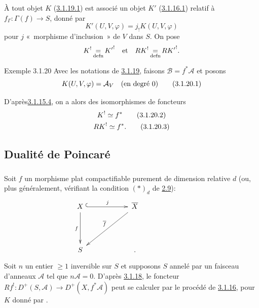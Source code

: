 \documentclass[10pt]{../fichiers-configuration-latex/smfart}
\begin{document}
À tout objet $K$ (\hyperref[XVIII.par3.1.19.1]{3.1.19.1}) est associé un objet $K'$
(\hyperref[XVIII.par3.1.16.1]{3.1.16.1}) 
relatif à $f_{\Gamma}:\Gamma(f)\rightarrow S$, donné par
\begin{equation*}
K'(U,V,\varphi)=j_{!}K(U,V,\varphi)\tag{3.1.19.2}
\end{equation*}%
pour $j$ « morphisme d'inclusion »  de $V$ dans $S$. On pose
$$
K^{!}\mathop{=}_{\operatorname{defn}} {K'}^{!}\quad \text{et}\quad RK^{!}\mathop{=}_{\operatorname{defn}}
R{K'}^{!}{}.
$$

\begin{enonce*}[remark]{Exemple 3.1.20}
Avec les notations de \hyperref[XVIII.exem3.1.19]{3.1.19}, faisons
$\mathcal{B}=f^{\ast}\mathcal{A}$ et posons
\begin{equation*}
K(U,V,\varphi)=\mathcal{A}_{V}\quad\text{\rm(en degré 0)}\tag{3.1.20.1}
\end{equation*}
\end{enonce*}

D'après\pageoriginale \hyperref[XVIII.par3.1.15.4]{3.1.15.4}, on a alors des
isomorphismes de foncteurs
\begin{gather*}
K^{!}\simeq f^{\ast}\tag{3.1.20.2}\\
RK^{!}\simeq f^{\ast}{}.\tag{3.1.20.3}
\end{gather*}

\subsection{Dualité de Poincaré}

\subsubsection{}
Soit $f$ un morphisme plat compactifiable purement de dimension
relative $d$ (ou, plus généralement, vérifiant la condition
$(\ast)_{d}$ de \hyperref[XVIII.thm2.9]{2.9}):
$$
\xymatrix@C=2cm@R=1.5cm@M=.2cm{
X \ar@{^{(}->}[r]^{j} \ar[d]_{f}& \bar{X}\ar[ld]_{\bar{f}} &\\
S &.
}
$$
Soit $n$ un entier $\geq 1$ inversible sur $S$ et supposons $S$ annelé
par un faisceau d'anneaux $\mathcal{A}$ tel que
$n\mathcal{A}=0$. D'après \hyperref[XVIII.exem3.1.18]{3.1.18}, le foncteur
$Rf^{!}:D^{+}(S,\mathcal{A})\rightarrow D^{+}(X,f^{\ast}\mathcal{A})$ peut se
calculer par le procédé de \hyperref[XVIII.subsubsec3.1.16]{3.1.16}, pour $K$ donné
par . 
\end{document}
